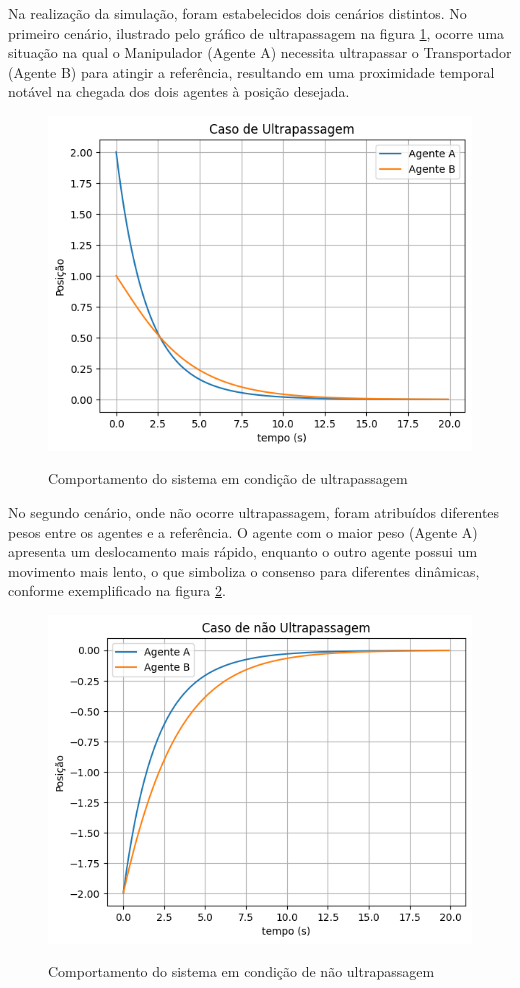 Na realização da simulação, foram estabelecidos dois cenários distintos. No primeiro cenário, ilustrado pelo gráfico de ultrapassagem na figura \ref{fig:simple_ultrapassagem}, ocorre uma situação na qual o Manipulador (Agente A) necessita ultrapassar o Transportador (Agente B) para atingir a referência, resultando em uma proximidade temporal notável na chegada dos dois agentes à posição desejada.
\begin{figure}[ht]
\centering
\caption{Comportamento do sistema em condição de ultrapassagem}
\includegraphics[width=0.8\linewidth]{figures/Simulation/Simples/simple_ultrapassagem.png}
\label{fig:simple_ultrapassagem}
\end{figure}

No segundo cenário, onde não ocorre ultrapassagem, foram atribuídos diferentes pesos entre os agentes e a referência. O agente com o maior peso (Agente A) apresenta um deslocamento mais rápido, enquanto o outro agente possui um movimento mais lento, o que simboliza o consenso para diferentes dinâmicas, conforme exemplificado na figura \ref{fig:simple_n_ultrapassagem}.

\begin{figure}[ht]
\centering
\caption{Comportamento do sistema em condição de não ultrapassagem}
\includegraphics[width=0.8\linewidth]{figures/Simulation/Simples/simple_n_ultrapassagem.png}
\label{fig:simple_n_ultrapassagem}
\end{figure}


